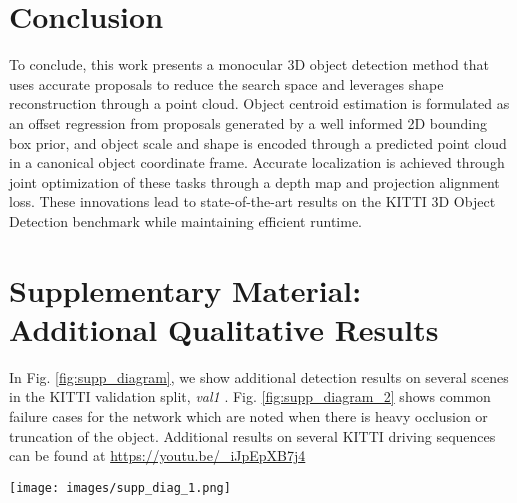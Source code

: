 \documentclass[10pt,twocolumn,letterpaper]{article}
\begin{document}
	\section{Conclusion}
	To conclude, this work presents a monocular 3D object detection method that uses accurate proposals to reduce the search space and leverages shape reconstruction through a point cloud. Object centroid estimation is formulated as an offset regression from proposals generated by a well informed 2D bounding box prior, and object scale and shape is encoded through a predicted point cloud in a canonical object coordinate frame. Accurate localization is achieved through joint optimization of these tasks through a depth map and projection alignment loss. These innovations lead to state-of-the-art results on the KITTI 3D Object Detection benchmark while maintaining efficient runtime.
	
	{\small
		
		
	}
	
	\clearpage

    \appendix
    \onecolumn
    
    \section*{Supplementary Material: Additional Qualitative Results}
	In Fig. \ref{fig:supp_diagram}, we show additional detection results on several scenes in the KITTI \cite{geiger_kitti} validation split, \textit{val1} \cite{chen_mv3d}. Fig. \ref{fig:supp_diagram_2} shows common failure cases for the network which are noted when there is heavy occlusion or truncation of the object. Additional results on several KITTI driving sequences can be found at \href{https://youtu.be/_iJpEpXB7j4}{https://youtu.be/\_iJpEpXB7j4}
	
	\begin{figure*}[h!tb]
	\begin{center}
		\texttt{[image: images/supp\_diag\_1.png]}
	\end{center}
	\caption{\textbf{Additional Qualitative Results:} 2D detections (top) are shown in \textbf{orange}. 3D detections in \textbf{green} are shown projected into the image (top) and in the 3D scene (bottom). Ground truth 3D boxes (bottom) are shown in \textbf{red}. Points within the detection boxes are the estimated point clouds from the network, while the background points are taken from the colorized interpolated LiDAR scan.}
	\label{fig:supp_diagram}
	\end{figure*}
	
\end{document}
